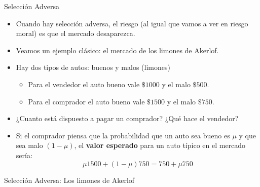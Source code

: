\documentclass{beamer}
\begin{document}
\begin{frame}{Selección Adversa}
    \begin{itemize}
        \item Cuando hay selección adversa, el riesgo (al igual que vamos a ver en riesgo moral) es que el mercado desaparezca.
        \vspace{1mm}
        \item Veamos un ejemplo clásico: el mercado de los limones de Akerlof.
        \vspace{1mm}
        \item Hay dos tipos de autos: buenos y malos (limones)
        \begin{itemize}
            \item Para el vendedor el auto bueno vale $\$1000$ y el malo $\$500$.
            \item Para el comprador el auto bueno vale $\$1500$ y el malo $\$750$.
        \end{itemize}
        \item ¿Cuanto está dispuesto a pagar un comprador? ¿Qué hace el vendedor?
        \item Si el comprador piensa que la probabilidad que un auto sea bueno es $\mu$ y que sea malo  $(1-\mu)$, el \textbf{valor esperado} para un auto típico en el mercado sería:
        \[\mu 1500 + (1-\mu) 750= 750 + \mu 750\] 
    \end{itemize}
\end{frame}

\begin{frame}{Selección Adversa: Los limones de Akerlof}

    \centering
\end{frame}
\end{document}
